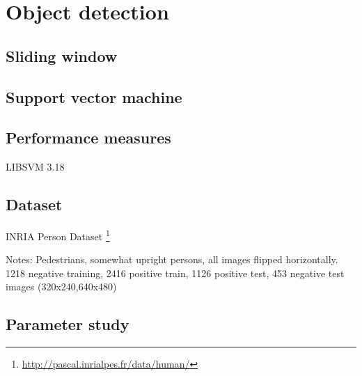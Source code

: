 \documentclass[thesis.tex]{subfiles}
\begin{document}
\chapter{Object detection}
\label{sec:od}

\section{Sliding window}

\section{Support vector machine}

\section{Performance measures}

LIBSVM 3.18 \cite{chang2011library}

\section{Dataset}
\label{sec:odDataset}

INRIA Person Dataset \footnote{\url{http://pascal.inrialpes.fr/data/human/}} \cite{dalal2005histograms}

Notes: Pedestrians, somewhat upright persons, all images flipped horizontally.
1218 negative training, 2416 positive train, 1126 positive test, 453 negative test images (320x240,640x480)

\section{Parameter study}
\label{sec:odParameterStudy}

\subbibliography
\end{document}
